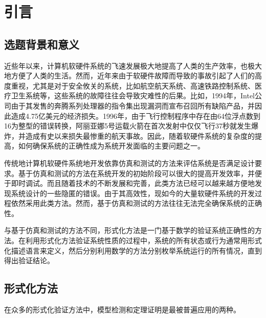 \chapter{引言}\label{chapt:intro}
\section{选题背景和意义}
近些年以来，计算机软硬件系统的飞速发展极大地提高了人类的生产效率，也极大地方便了人类的生活。然而，近年来由于软硬件故障而导致的事故引起了人们的高度重视，尤其是对于安全攸关的系统，比如航空航天系统、高速铁路控制系统、医疗卫生系统等，这些系统的故障往往会导致灾难性的后果。比如，1994年，Intel公司由于其发售的奔腾系列处理器的指令集出现漏洞而宣布召回所有缺陷产品，并因此造成4.75亿美元的经济损失。1996年，由于飞行控制程序中存在由64位浮点数到16为整型的错误转换，阿丽亚娜5号运载火箭在首次发射中仅仅飞行37秒就发生爆炸，并造成有史以来损失最惨重的航天事故。因此，随着软硬件系统的复杂度的提高，如何确保系统的正确性成为系统开发面临的主要问题之一。

传统地计算机软硬件系统地开发依靠仿真和测试的方法来评估系统是否满足设计要求。基于仿真和测试的方法在系统开发的初始阶段可以很大的提高开发效率，并便于即时调试。而且随着技术的不断发展和完善，此类方法已经可以越来越方便地发现系统设计的一些隐匿的错误。由于其高效性，现如今的大量软硬件系统的开发过程依然采用此类方法。然而，基于仿真和测试的方法往往无法完全确保系统的正确性。

与基于仿真和测试的方法不同，形式化方法是一门基于数学的验证系统正确性的方法。在利用形式化方法验证系统性质的过程中，系统的所有状态或行为通常用形式化描述语言来定义，然后分别利用数学的方法分别枚举系统运行的所有情况，直到得出验证结论。
\section{形式化方法}
在众多的形式化验证方法中，模型检测和定理证明是最被普遍应用的两种。
